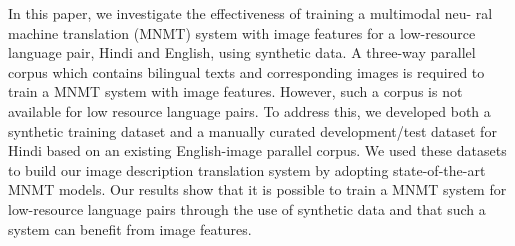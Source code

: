 In this paper, we investigate the effectiveness of training a multimodal neu- ral machine translation (MNMT) system with image features for a low-resource language pair, Hindi and English, using synthetic data. A three-way parallel corpus which contains bilingual texts and corresponding images is required to train a MNMT system with image features. However, such a corpus is not available for low resource language pairs. To address this, we developed both a synthetic training dataset and a manually curated development/test dataset for Hindi based on an existing English-image parallel corpus. We used these datasets to build our image description translation system by adopting state-of-the-art MNMT models. Our results show that it is possible to train a MNMT system for low-resource language pairs through the use of synthetic data and that such a system can benefit from image features.
